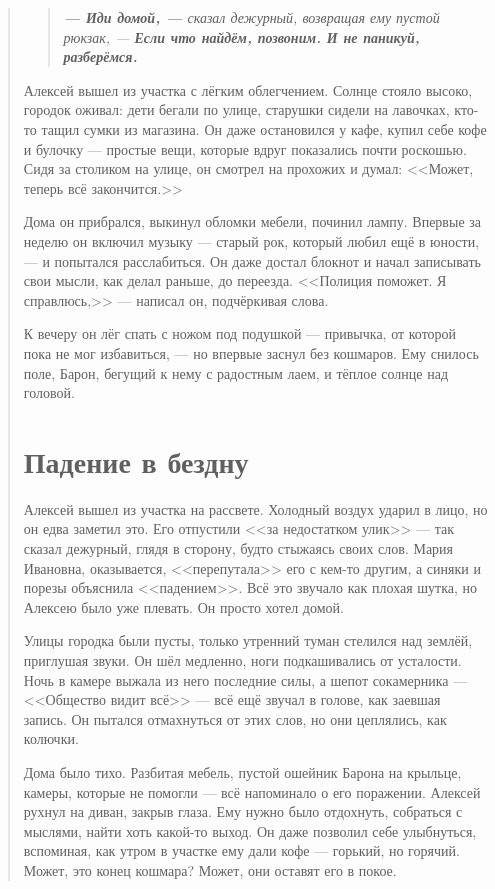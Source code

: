 \documentclass[12pt,a4paper]{book}
\newenvironment{dialogue}{\begin{quote}\itshape}{\end{quote}} %
\begin{document}
\begin{dialogue}
\begin{dialogue}
\textbf{--- Иди домой, ---} сказал дежурный, возвращая ему пустой рюкзак, --- \textbf{Если что найдём, позвоним. И не паникуй, разберёмся.}
\end{dialogue}

Алексей вышел из участка с лёгким облегчением. Солнце стояло высоко, городок оживал: дети бегали по улице, старушки сидели на лавочках, кто-то тащил сумки из магазина. Он даже остановился у кафе, купил себе кофе и булочку --- простые вещи, которые вдруг показались почти роскошью. Сидя за столиком на улице, он смотрел на прохожих и думал: <<Может, теперь всё закончится.>>

Дома он прибрался, выкинул обломки мебели, починил лампу. Впервые за неделю он включил музыку --- старый рок, который любил ещё в юности, --- и попытался расслабиться. Он даже достал блокнот и начал записывать свои мысли, как делал раньше, до переезда. <<Полиция поможет. Я справлюсь,>> --- написал он, подчёркивая слова.

К вечеру он лёг спать с ножом под подушкой --- привычка, от которой пока не мог избавиться, --- но впервые заснул без кошмаров. Ему снилось поле, Барон, бегущий к нему с радостным лаем, и тёплое солнце над головой.

\chapter{Падение в бездну}

Алексей вышел из участка на рассвете. Холодный воздух ударил в лицо, но он едва заметил это. Его отпустили <<за недостатком улик>> --- так сказал дежурный, глядя в сторону, будто стыжаясь своих слов. Мария Ивановна, оказывается, <<перепутала>> его с кем-то другим, а синяки и порезы объяснила <<падением>>. Всё это звучало как плохая шутка, но Алексею было уже плевать. Он просто хотел домой.

Улицы городка были пусты, только утренний туман стелился над землёй, приглушая звуки. Он шёл медленно, ноги подкашивались от усталости. Ночь в камере выжала из него последние силы, а шепот сокамерника --- <<Общество видит всё>> --- всё ещё звучал в голове, как заевшая запись. Он пытался отмахнуться от этих слов, но они цеплялись, как колючки.

Дома было тихо. Разбитая мебель, пустой ошейник Барона на крыльце, камеры, которые не помогли --- всё напоминало о его поражении. Алексей рухнул на диван, закрыв глаза. Ему нужно было отдохнуть, собраться с мыслями, найти хоть какой-то выход. Он даже позволил себе улыбнуться, вспоминая, как утром в участке ему дали кофе --- горький, но горячий. Может, это конец кошмара? Может, они оставят его в покое.


\end{dialogue}
\end{document}
